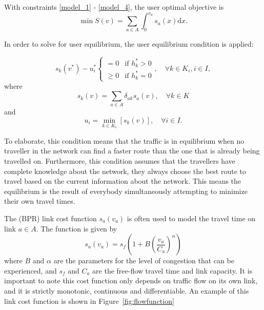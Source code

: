 With constraints \eqref{model_1} - \eqref{model_4},
the user optimal objective is
\begin{equation}
    \min S(v) = \sum_{a\in A} \int_0^{v_a} s_a(x) \mathrm{d} x.
\end{equation}

In order to solve for user equilibrium,
the \citep{Wardrop} user equilibrium condition is applied:

\begin{equation} \label{wardrop1}
    s_k(v^{\ast}) - u_i^{\ast} 
    \begin{cases}
        =0 & \text{if } h_k^{\ast} > 0 \\
        \geq 0 & \text{if } h_k^{\ast} = 0
    \end{cases}
    ,
    \quad \forall k \in K_i, i \in I,
\end{equation}
where 
\begin{equation}
    s_k(v) = \sum_{a \in A} \delta_{ak} s_a(v), \quad \forall k \in K
\end{equation}
and
\begin{equation} \label{wardrop3}
    u_i = \min_{k \in K_i} \left[ s_k(v) \right], \quad \forall i \in I.
\end{equation}

To elaborate, this condition means that the traffic is in equilibrium when no traveller in the network can find a faster route than the one that is already being travelled on.
Furthermore, this condition assumes that the travellers have complete knowledge about the network,
they always choose the best route to travel based on the current information about the network.
This means the equilibrium is the result of everybody simultaneously attempting to minimize their own travel times.

The \citet{BPR} (BPR) link cost function
$s_a(v_a)$ is often used to model the travel time on link $a \in A$.
The function is given by
\begin{equation}
    s_a(v_a) = s_f \left(1 + B \left( \frac{v_a}{C_a} \right)^\alpha \right)
\end{equation}
where $B$ and $\alpha$ are the parameters for the level of congestion that can be experienced,
and $s_f$ and $C_a$ are the free-flow travel time and link capacity.
It is important to note this cost function only depends on traffic flow on its own link, and it is strictly monotonic, continuous and differentiable.
An example of this link cost function is shown in Figure~\ref{fig:flowfunction}

